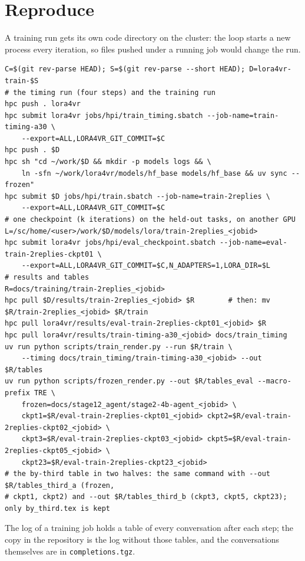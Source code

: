\documentclass[11pt,a4paper]{article}
\begin{document}
\section{Reproduce}
\sloppy
A training run gets its own code directory on the cluster: the loop starts a
new process every iteration, so files pushed under a running job would
change the run.
\begin{scriptsize}
\begin{verbatim}
C=$(git rev-parse HEAD); S=$(git rev-parse --short HEAD); D=lora4vr-train-$S
# the timing run (four steps) and the training run
hpc push . lora4vr
hpc submit lora4vr jobs/hpi/train_timing.sbatch --job-name=train-timing-a30 \
    --export=ALL,LORA4VR_GIT_COMMIT=$C
hpc push . $D
hpc sh "cd ~/work/$D && mkdir -p models logs && \
    ln -sfn ~/work/lora4vr/models/hf_base models/hf_base && uv sync --frozen"
hpc submit $D jobs/hpi/train.sbatch --job-name=train-2replies \
    --export=ALL,LORA4VR_GIT_COMMIT=$C
# one checkpoint (k iterations) on the held-out tasks, on another GPU
L=/sc/home/<user>/work/$D/models/lora/train-2replies_<jobid>
hpc submit lora4vr jobs/hpi/eval_checkpoint.sbatch --job-name=eval-train-2replies-ckpt01 \
    --export=ALL,LORA4VR_GIT_COMMIT=$C,N_ADAPTERS=1,LORA_DIR=$L
# results and tables
R=docs/training/train-2replies_<jobid>
hpc pull $D/results/train-2replies_<jobid> $R        # then: mv $R/train-2replies_<jobid> $R/train
hpc pull lora4vr/results/eval-train-2replies-ckpt01_<jobid> $R
hpc pull lora4vr/results/train-timing-a30_<jobid> docs/train_timing
uv run python scripts/train_render.py --run $R/train \
    --timing docs/train_timing/train-timing-a30_<jobid> --out $R/tables
uv run python scripts/frozen_render.py --out $R/tables_eval --macro-prefix TRE \
    frozen=docs/stage12_agent/stage2-4b-agent_<jobid> \
    ckpt1=$R/eval-train-2replies-ckpt01_<jobid> ckpt2=$R/eval-train-2replies-ckpt02_<jobid> \
    ckpt3=$R/eval-train-2replies-ckpt03_<jobid> ckpt5=$R/eval-train-2replies-ckpt05_<jobid> \
    ckpt23=$R/eval-train-2replies-ckpt23_<jobid>
# the by-third table in two halves: the same command with --out $R/tables_third_a (frozen,
# ckpt1, ckpt2) and --out $R/tables_third_b (ckpt3, ckpt5, ckpt23); only by_third.tex is kept
\end{verbatim}
\end{scriptsize}
The log of a training job holds a table of every conversation after each
step; the copy in the repository is the log without those tables, and the
conversations themselves are in \texttt{completions.tgz}.
\fussy
\end{document}
